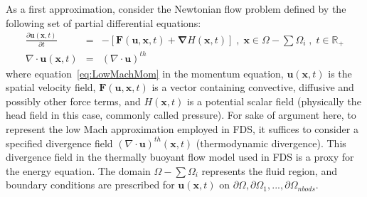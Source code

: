 As a first approximation, consider the Newtonian flow problem defined by the following set of partial differential equations:
%
\begin{eqnarray}
  \frac{\partial \mathbf{u}(\mathbf{x},t)}{\partial t} &=& - \left[ \mathbf{F}(\mathbf{u},\mathbf{x},t) + \boldsymbol{\nabla} H(\mathbf{x},t) \right] \; , \; \mathbf{x} \in \Omega - \sum{\Omega_i} \; , \; t \in \mathbb{R}_+ \label{eq:LowMachMom} \\
         \nabla \cdot \mathbf{u} (\mathbf{x},t) & = & \left(\nabla \cdot \mathbf{u} \right)^{th} \label{eq:LowMachDiv}
\end{eqnarray}
%
where equation~\eqref{eq:LowMachMom} in the momentum equation, $\mathbf{u}(\mathbf{x},t)$ is the spatial velocity field, $\mathbf{F}(\mathbf{u},\mathbf{x},t)$ is a vector containing convective, diffusive and possibly other force terms, and $H(\mathbf{x},t)$ is a potential scalar field (physically the head field in this case, commonly called pressure). For sake of argument here, to represent the low Mach approximation employed in FDS, it suffices to consider a specified divergence field $\left(\nabla \cdot \mathbf{u} \right)^{th} (\mathbf{x},t)$ (thermodynamic divergence). This divergence field in the thermally buoyant flow model used in FDS is a proxy for the energy equation.
The domain $\Omega - \sum{\Omega_i}$ represents the fluid region, and boundary conditions are prescribed for $\mathbf{u}(\mathbf{x},t)$ on $\partial \Omega,\partial \Omega_1,...,\partial \Omega_{nbods}$.

